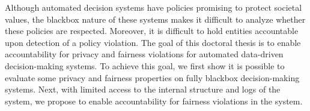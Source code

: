 \documentclass[10pt, onecolumn]{report}
\begin{document}
Although automated decision systems have policies 
promising to protect societal values, the blackbox nature of these systems 
makes it difficult to analyze whether these policies are respected. 
Moreover, it is difficult to hold entities accountable upon detection of a policy violation.
The goal of this doctoral thesis is to enable accountability for privacy and fairness 
violations for automated data-driven decision-making systems. To achieve this 
goal, we first show it is possible to evaluate some privacy and fairness 
properties on fully blackbox decision-making systems. 
Next, with limited access to the internal structure and logs of the system, we propose to 
enable accountability for fairness violations in the system. 


\end{document}
